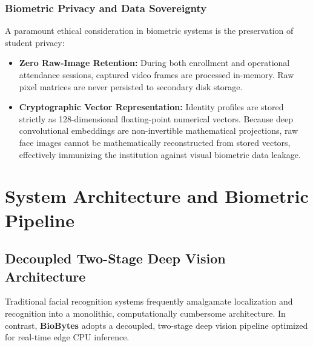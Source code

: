 \documentclass[12pt,a4paper,oneside]{report}
\begin{document}
\subsection{Biometric Privacy and Data Sovereignty}
A paramount ethical consideration in biometric systems is the preservation of student privacy:
\begin{itemize}
    \item \textbf{Zero Raw-Image Retention:} During both enrollment and operational attendance sessions, captured video frames are processed in-memory. Raw pixel matrices are never persisted to secondary disk storage.
    \item \textbf{Cryptographic Vector Representation:} Identity profiles are stored strictly as 128-dimensional floating-point numerical vectors. Because deep convolutional embeddings are non-invertible mathematical projections, raw face images cannot be mathematically reconstructed from stored vectors, effectively immunizing the institution against visual biometric data leakage.
\end{itemize}

\chapter{System Architecture and Biometric Pipeline}

\section{Decoupled Two-Stage Deep Vision Architecture}
Traditional facial recognition systems frequently amalgamate localization and recognition into a monolithic, computationally cumbersome architecture. In contrast, \textbf{BioBytes} adopts a decoupled, two-stage deep vision pipeline optimized for real-time edge CPU inference. 
\end{document}
